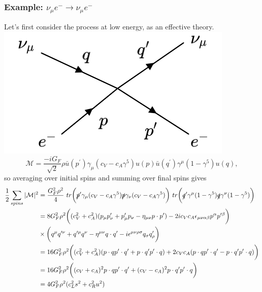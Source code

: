 \subsubsection{Example: $\nu_\mu e^- \to \nu_\mu e^-$}
%
Let's first consider the process at low energy, as an effective theory.
\newline
  \includegraphics[width=0.4\linewidth]{figs/24b.png}
\newline
\begin{equation}
\mathcal{M} = \frac{-iG_F}{\sqrt{2}} \rho \bar{u}(p^\prime) \gamma_\mu(c_V - c_A \gamma^5) u(p) \bar{u}(q^\prime) \gamma^\mu (1-\gamma^5) u(q),
\end{equation}
so averaging over initial spins and summing over final spins gives
\begin{equation}
\begin{split}
\frac{1}{2}\sum_{spins}|\mathcal{M}|^2 &= \frac{G_F^2\rho^2}{4}\ tr \bigg(\slashed{p}^\prime \gamma_\mu(c_V-c_A\gamma^5)\slashed{p}\gamma_\nu(c_V-c_A \gamma^5)\bigg)\ tr \bigg(\slashed{q}^\prime \gamma^\mu(1-\gamma^5)\slashed{q}\gamma^\nu(1-\gamma^5)\bigg) \\
&= 8G_F^2 \rho^2 \bigg( (c_V^2+c_A^2)(p_\mu p^\prime_\nu + p^\prime_\mu p_\nu - \eta_{\mu \nu} p\cdot p^\prime) - 2ic_Vc_A \epsilon_{\mu \nu \alpha \beta}p^\alpha p^{\prime \beta}\bigg) \\
&\times \bigg(q^\mu q^{\prime \nu} + q^{\prime \mu} q^\nu -\eta^{\mu \nu} q \cdot q^\prime - i\epsilon^{\mu \nu \rho \sigma}q_\sigma q^\prime_\rho \bigg) \\
&= 16G_F^2 \rho^2 \bigg( (c_V^2+c_A^2)(p \cdot q p^\prime \cdot q^\prime + p\cdot q^\prime p^\prime \cdot q) + 2c_Vc_A(p \cdot q p^\prime \cdot q^\prime - p\cdot q^\prime p^\prime \cdot q) \bigg) \\
&= 16G_F^2 \rho^2 \bigg((c_V+c_A)^2 p \cdot q p^\prime \cdot q^\prime + (c_V-c_A)^2 p \cdot q^\prime p^\prime \cdot q \bigg) \\
&= 4 G_F^2\rho^2(c_L^2s^2 + c_R^2u^2)
\end{split}
\end{equation}
